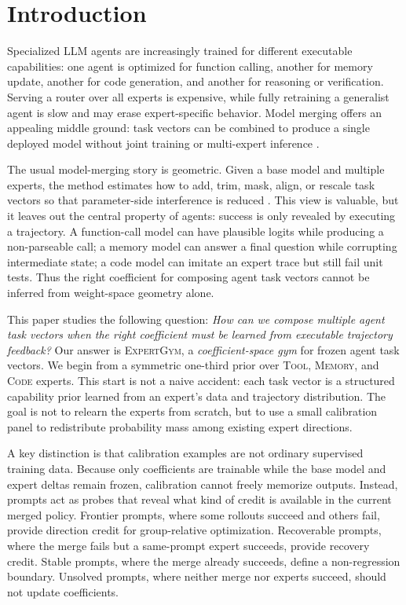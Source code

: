 \documentclass[11pt]{article}
\newcommand{\method}{\textsc{ExpertGym}\xspace}
\newcommand{\tool}{\textsc{Tool}\xspace}
\newcommand{\mem}{\textsc{Memory}\xspace}
\newcommand{\code}{\textsc{Code}\xspace}
\newcommand{\vectorgym}{\textit{coefficient-space gym}\xspace}
\begin{document}
\section{Introduction}

Specialized LLM agents are increasingly trained for different executable capabilities: one agent is optimized for function calling, another for memory update, another for code generation, and another for reasoning or verification.  Serving a router over all experts is expensive, while fully retraining a generalist agent is slow and may erase expert-specific behavior.  Model merging offers an appealing middle ground: task vectors can be combined to produce a single deployed model without joint training or multi-expert inference \citep{wortsman2022model,ilharco2023editing}.

The usual model-merging story is geometric.  Given a base model and multiple experts, the method estimates how to add, trim, mask, align, or rescale task vectors so that parameter-side interference is reduced \citep{yadav2023ties,yu2023dare,deep2024della,gargiulo2025tsv,cheng2025wudi}.  This view is valuable, but it leaves out the central property of agents: success is only revealed by executing a trajectory.  A function-call model can have plausible logits while producing a non-parseable call; a memory model can answer a final question while corrupting intermediate state; a code model can imitate an expert trace but still fail unit tests.  Thus the right coefficient for composing agent task vectors cannot be inferred from weight-space geometry alone.

This paper studies the following question: \emph{How can we compose multiple agent task vectors when the right coefficient must be learned from executable trajectory feedback?}  Our answer is \method, a \vectorgym for frozen agent task vectors.  We begin from a symmetric one-third prior over \tool, \mem, and \code experts.  This start is not a naive accident: each task vector is a structured capability prior learned from an expert's data and trajectory distribution.  The goal is not to relearn the experts from scratch, but to use a small calibration panel to redistribute probability mass among existing expert directions.

A key distinction is that calibration examples are not ordinary supervised training data.  Because only coefficients are trainable while the base model and expert deltas remain frozen, calibration cannot freely memorize outputs.  Instead, prompts act as probes that reveal what kind of credit is available in the current merged policy.  Frontier prompts, where some rollouts succeed and others fail, provide direction credit for group-relative optimization.  Recoverable prompts, where the merge fails but a same-prompt expert succeeds, provide recovery credit.  Stable prompts, where the merge already succeeds, define a non-regression boundary.  Unsolved prompts, where neither merge nor experts succeed, should not update coefficients.
\end{document}
